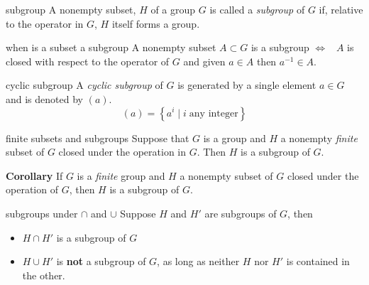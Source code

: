 \documentclass[avery5371,grid]{flashcards}
\begin{document}
\begin{flashcard}[Definition]{subgroup}
A nonempty subset, $H$ of a group $G$ is called a \mbox{\textit{subgroup}}
of $G$ if, relative to the operator in $G$, $H$ itself forms a group.
\end{flashcard}

\begin{flashcard}[Lemma]{when is a subset a subgroup}
A nonempty subset $A\subset G$ is a subgroup $\Leftrightarrow$ \
$A$ is closed with respect to the operator of $G$ and given $a \in A$ then $a^{-1} \in A$.
\end{flashcard}

\begin{flashcard}[Definition]{cyclic subgroup}
\vspace*{\stretch{1}}
A \textit{cyclic subgroup} of $G$ is generated by a single element $a \in G$ and is denoted by $(a)$.
\begin{equation*}
(a) = \left\lbrace a^i \mid i \; \textrm{any integer} \right\rbrace
\end{equation*}
\end{flashcard}

\begin{flashcard}[Lemma]{finite subsets and subgroups}
\vspace*{\stretch{1}}
Suppose that $G$ is a group and $H$ a nonempty \textit{finite} subset of $G$
closed under the operation in $G$.  Then $H$ is a subgroup of $G$.

\textbf{Corollary}  If $G$ is a \textit{finite} group and $H$ a nonempty subset of $G$
closed under the operation of $G$, then $H$ is a subgroup of $G$.
\end{flashcard}

\begin{flashcard}[Lemma]{subgroups under $\cap$ and $\cup$}
\vspace*{\stretch{1}}
Suppose $H$ and $H'$ are subgroups of $G$, then
\begin{itemize}
\item $H \cap H'$ is a subgroup of $G$
\item $H \cup H'$ is \textbf{not} a subgroup of $G$, as long as neither
$H$ nor $H'$ is contained in the other.
\end{itemize}
\end{flashcard}
\end{document}
